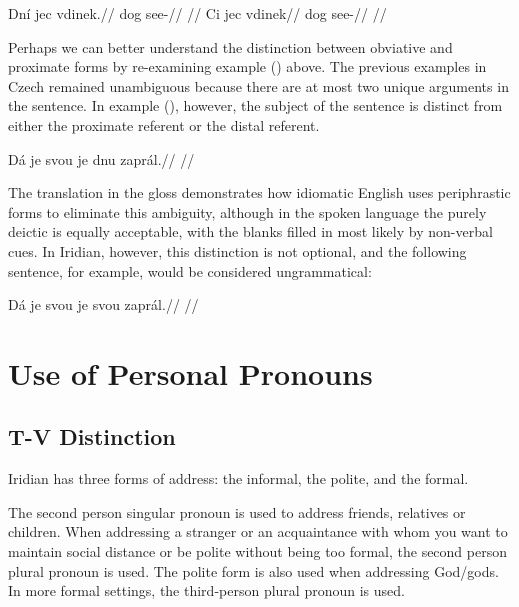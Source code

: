 \pex
\a
\begingl
\gla Dn\'i jec vdinek.//
\glb {} dog see-//
\glft {}//
\endgl
\a \begingl
\gla Ci jec vdinek//
\glb {} dog see-//
\glft {}//
\endgl
\xe

Perhaps we can better understand the distinction between obviative and proximate forms by re-examining example () above. The previous examples in Czech remained unambiguous because there are at most two unique arguments in the sentence. In example (), however, the subject of the sentence is distinct from either the proximate referent or the distal referent.

\ex[exno={\getfullref{obv.obv1}}]
\begingl
\gla D\'a je svou je dnu zapr\'al.//
\glft {}//
\endgl
\xe

The translation in the gloss demonstrates how idiomatic English uses periphrastic forms to eliminate this ambiguity, although in the spoken language the purely deictic  is equally acceptable, with the blanks filled in most likely by non-verbal cues. In Iridian, however, this distinction is not optional, and the following sentence, for example, would be considered ungrammatical:

\ex
\begingl
\gla *D\'a je svou je svou zapr\'al.//
\glft {}//
\endgl
\xe

\section{Use of Personal Pronouns}

\subsection{T-V Distinction}

Iridian has three forms of address: the informal, the polite, and the formal.

The second person singular pronoun  is used to address friends, relatives or children. When addressing a stranger or an acquaintance with whom you want to maintain social distance or be polite without being too formal, the second person plural pronoun  is used. The polite form is also used when addressing God/gods. In more formal settings, the third-person plural pronoun  is used.



